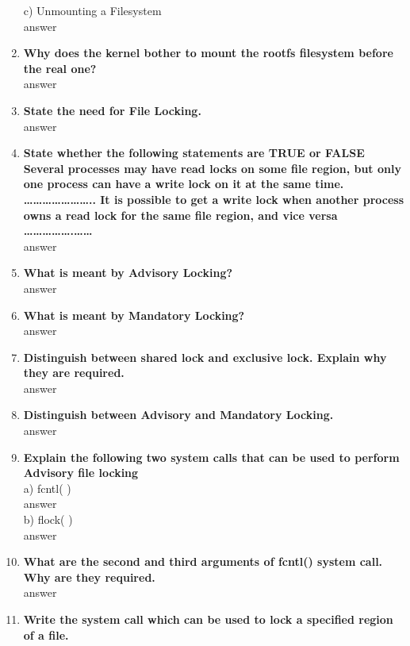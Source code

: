 \documentclass[a4paper,12pt]{article}
\begin{document}
\begin{flushleft}
\begin{enumerate}
c) Unmounting a Filesystem\\{\color{red}answer}\\
\item \textbf{  Why does the kernel bother to mount the rootfs filesystem before the real one?}\\
{\color{red}answer}\\
\item \textbf{  State the need for File Locking.}\\
{\color{red}answer}\\
\item \textbf{  State whether the following statements are TRUE or FALSE
Several processes may have read locks on some file region, but only one process can have a write lock on it at the same time. …………………..
It is possible to get a write lock when another process owns a read lock for the same file region, and vice versa …………….……}\\
{\color{red}answer}\\
\item \textbf{  What is meant by Advisory Locking?}\\
{\color{red}answer}\\
\item \textbf{  What is meant by Mandatory Locking?}\\
{\color{red}answer}\\
\item \textbf{  Distinguish between shared lock and exclusive lock. Explain why they are required.}\\
{\color{red}answer}\\
\item \textbf{  Distinguish between Advisory and Mandatory Locking.}\\
{\color{red}answer}\\
\item \textbf{  Explain the following two system calls that can be used to perform Advisory file locking}\\
a) fcntl( )\\{\color{red}answer}\\
 b) flock( )\\{\color{red}answer}\\
\item \textbf{  What are the second and third arguments of fcntl() system call. Why are they required.}\\
{\color{red}answer}\\
\item \textbf{  Write the system call which can be used to lock a specified region of a file.}\\

\end{enumerate}
\end{flushleft}
\end{document}
